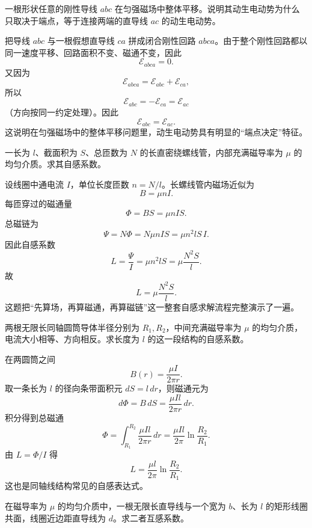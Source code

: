 \documentclass[lang=cn,11pt]{elegantbook}
\begin{document}
\begin{example}[折线导线的动生电动势为何等于两端弦线]
一根形状任意的刚性导线 \(abc\) 在匀强磁场中整体平移。说明其动生电动势为什么只取决于端点，等于连接两端的直导线 \(ac\) 的动生电动势。
\end{example}

\begin{solution}
把导线 \(abc\) 与一根假想直导线 \(ca\) 拼成闭合刚性回路 \(abca\)。由于整个刚性回路都以同一速度平移、回路面积不变、磁通不变，因此
\[
\mathcal{E}_{abca}=0.
\]
又因为
\[
\mathcal{E}_{abca}=\mathcal{E}_{abc}+\mathcal{E}_{ca},
\]
所以
\[
\mathcal{E}_{abc}=-\mathcal{E}_{ca}=\mathcal{E}_{ac}
\]
（方向按同一约定处理）。因此
\[
\boxed{\mathcal{E}_{abc}=\mathcal{E}_{ac}}.
\]
这说明在匀强磁场中的整体平移问题里，动生电动势具有明显的“端点决定”特征。
\end{solution}

\begin{example}[长直螺线管的自感系数]
一长为 \(l\)、截面积为 \(S\)、总匝数为 \(N\) 的长直密绕螺线管，内部充满磁导率为 \(\mu\) 的均匀介质。求其自感系数。
\end{example}

\begin{solution}
设线圈中通电流 \(I\)，单位长度匝数 \(n=N/l\)。长螺线管内磁场近似为
\[
B=\mu nI.
\]
每匝穿过的磁通量
\[
\Phi=BS=\mu nIS.
\]
总磁链为
\[
\Psi=N\Phi=N\mu nIS=\mu n^2lS\,I.
\]
因此自感系数
\[
L=\frac{\Psi}{I}=\mu n^2lS=\mu\frac{N^2S}{l}.
\]
故
\[
\boxed{
L=\mu\frac{N^2S}{l}
}.
\]
这题把“先算场，再算磁通，再算磁链”这一整套自感求解流程完整演示了一遍。
\end{solution}

\begin{example}[同轴圆筒导体回路的自感系数]
两根无限长同轴圆筒导体半径分别为 \(R_1,R_2\)，中间充满磁导率为 \(\mu\) 的均匀介质，电流大小相等、方向相反。求长度为 \(l\) 的这一段结构的自感系数。
\end{example}

\begin{solution}
在两圆筒之间
\[
B(r)=\frac{\mu I}{2\pi r}.
\]
取一条长为 \(l\) 的径向条带面积元 \(dS=l\,dr\)，则磁通元为
\[
d\Phi=B\,dS=\frac{\mu I l}{2\pi r}\,dr.
\]
积分得到总磁通
\[
\Phi=\int_{R_1}^{R_2}\frac{\mu I l}{2\pi r}\,dr
=\frac{\mu I l}{2\pi}\ln\frac{R_2}{R_1}.
\]
由 \(L=\Phi/I\) 得
\[
\boxed{
L=\frac{\mu l}{2\pi}\ln\frac{R_2}{R_1}
}.
\]
这也是同轴线结构常见的自感表达式。
\end{solution}

\begin{example}[长直导线与矩形线圈的互感]
在磁导率为 \(\mu\) 的均匀介质中，一根无限长直导线与一个宽为 \(b\)、长为 \(l\) 的矩形线圈共面，线圈近边距直导线为 \(d\)。求二者互感系数。
\end{example}
\end{document}
